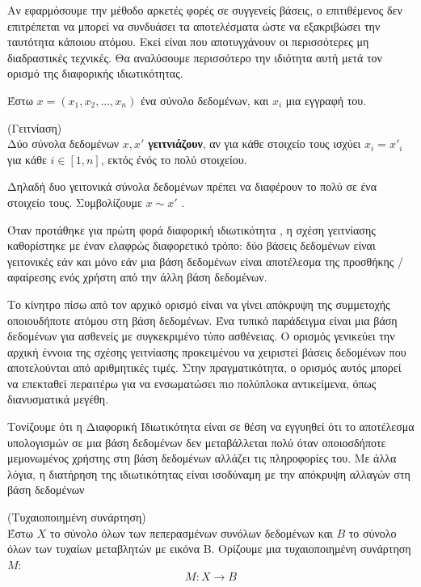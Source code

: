Αν εφαρμόσουμε την μέθοδο αρκετές φορές σε συγγενείς βάσεις, ο επιτιθέμενος δεν επιτρέπεται να μπορεί να συνδυάσει τα αποτελέσματα ώστε να εξακριβώσει την ταυτότητα κάποιου ατόμου. Εκεί είναι που αποτυγχάνουν οι περισσότερες μη διαδραστικές τεχνικές. Θα αναλύσουμε περισσότερο την ιδιότητα αυτή μετά τον ορισμό της διαφορικής ιδιωτικότητας.




Έστω $x=(x_1,x_2,...,x_n)$ ένα σύνολο δεδομένων, και $x_i$ μια εγγραφή του.

\begin{definition}(Γειτνίαση)\\
Δύο σύνολα δεδομένων $x,x'$ \textbf{γειτνιάζουν}, αν για κάθε στοιχείο τους ισχύει
$ x_i=x'_i $ για κάθε $i\in [1,n]$, εκτός ένός το πολύ στοιχείου.
\end{definition}

Δηλαδή δυο γειτονικά σύνολα δεδομένων πρέπει να διαφέρουν το πολύ σε ένα στοιχείο τους. Συμβολίζουμε $x\sim x'$ 
\textlatin{\cite{dpc}}.

Όταν προτάθηκε για πρώτη φορά διαφορική ιδιωτικότητα , η σχέση γειτνίασης καθορίστηκε με έναν ελαφρώς διαφορετικό τρόπο: δύο βάσεις δεδομένων είναι γειτονικές εάν και μόνο εάν μια βάση δεδομένων είναι αποτέλεσμα της προσθήκης / αφαίρεσης ενός χρήστη από την άλλη βάση δεδομένων\textlatin{\cite{10.1007/11681878_14}}. 

Το κίνητρο πίσω από τον αρχικό ορισμό είναι να γίνει απόκρυψη της συμμετοχής οποιουδήποτε ατόμου στη βάση δεδομένων. Ένα τυπικό παράδειγμα είναι μια βάση δεδομένων για ασθενείς με συγκεκριμένο τύπο ασθένειας.
Ο ορισμός γενικεύει την αρχική έννοια της σχέσης γειτνίασης προκειμένου να χειριστεί βάσεις δεδομένων που αποτελούνται από αριθμητικές τιμές. Στην πραγματικότητα,  ο ορισμός αυτός μπορεί να επεκταθεί περαιτέρω για να ενσωματώσει πιο πολύπλοκα αντικείμενα, όπως διανυσματικά μεγέθη.

Τονίζουμε ότι η Διαφορική Ιδιωτικότητα είναι σε θέση να εγγυηθεί ότι το αποτέλεσμα υπολογισμών σε μια βάση δεδομένων δεν μεταβάλλεται πολύ όταν οποιοσδήποτε μεμονωμένος χρήστης στη βάση δεδομένων αλλάζει τις πληροφορίες του.
Με άλλα λόγια, η διατήρηση της ιδιωτικότητας είναι ισοδύναμη με την απόκρυψη αλλαγών στη βάση δεδομένων

\begin{definition} (Τυχαιοποιημένη συνάρτηση)\\
Έστω $X$ το σύνολο όλων των πεπερασμένων συνόλων δεδομένων και $B$ το σύνολο όλων των τυχαίων μεταβλητών με εικόνα Β. Ορίζουμε μια τυχαιοποιημένη συνάρτηση $M$:
$$M:X\longrightarrow  B $$
\end{definition}


